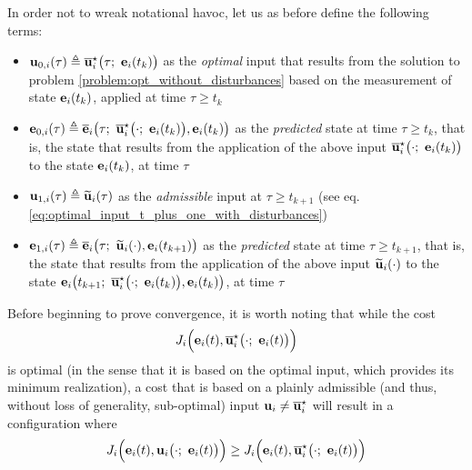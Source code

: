 In order not to wreak notational havoc, let us as  before define the following
terms:
\begin{gg_box}
\begin{itemize}
  \item $\bm{\mathbf{u}}_{0,i}(\tau) \triangleq \overline{\bm{\mathbf{u}}}_i^{\star}\big(\tau;\ \bm{\mathbf{e}}_i(t_k)\big)$
    as the \textit{optimal} input that results from the solution to problem
    \eqref{problem:opt_without_disturbances} based on the measurement of state
    $\bm{\mathbf{e}}_i(t_k)$, applied at time $\tau \geq t_k$
  \item $\vect{e}_{0,i}(\tau) \triangleq \overline{\vect{e}}_i\big(\tau;\ \overline{\vect{u}}_i^{\star}\big(\cdot;\ \vect{e}_i(t_k)\big), \vect{e}_i(t_k)\big)$
    as the \textit{predicted} state at time $\tau \geq t_k$, that is,
    the state that results from the application of the above input
    $\overline{\vect{u}}_i^{\star}\big(\cdot;\ \vect{e}_i(t_k)\big)$ to the
    state $\bm{\mathbf{e}}_i(t_k)$, at time $\tau$
  \item $\bm{\mathbf{u}}_{1,i}(\tau) \triangleq \widetilde{\bm{\mathbf{u}}}_i(\tau)$
    as the \textit{admissible} input at $\tau \geq t_{k+1}$
    (see eq. \eqref{eq:optimal_input_t_plus_one_with_disturbances})
  \item $\bm{\mathbf{e}}_{1,i}(\tau) \triangleq \overline{\bm{\mathbf{e}}}_i\big(\tau;\ \widetilde{\bm{\mathbf{u}}}_i(\cdot), \bm{\mathbf{e}}_i(t_{k+1})\big)$
    as the \textit{predicted} state at time $\tau \geq t_{k+1}$, that is,
    the state that results from the application of the above input
    $\widetilde{\bm{\mathbf{u}}}_i(\cdot)$ to the state
    $\vect{e}_i\big(t_{k+1};\ \overline{\vect{u}}_i^{\star}\big(\cdot;\ \vect{e}_i(t_k)\big), \vect{e}_i(t_k)\big)$, at time $\tau$
\end{itemize}
\end{gg_box}





Before beginning to prove convergence, it is worth noting that while the cost
$$J_i \Big(\vect{e}_i(t), \overline{\vect{u}}_i^{\star}\big(\cdot;\ \vect{e}_i(t)\big)\Big)$$
is optimal (in the sense that it is based on the optimal input, which provides
its minimum realization), a cost that is based on a plainly admissible
(and thus, without loss of generality, sub-optimal) input
$\bm{\mathbf{u}}_i \not= \overline{\bm{\mathbf{u}}}_i^{\star}$ will result in a configuration where
\begin{equation}
J_i \Big(\vect{e}_i(t), \vect{u}_i\big(\cdot;\ \vect{e}_i(t)\big)\Big)
\geq J_i \Big(\vect{e}_i(t), \overline{\vect{u}}_i^{\star}\big(\cdot;\ \vect{e}_i(t)\big)\Big)
\end{equation}

